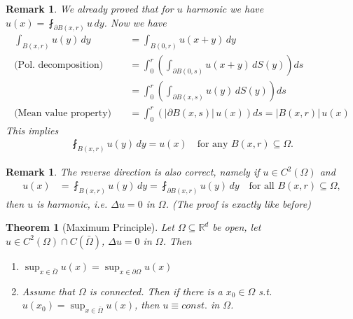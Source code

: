 \documentclass{report}
\theoremstyle{tommy}
\newtheorem{thm}[defn]{Theorem}
\newtheorem{rem}[defn]{Remark}
\begin{document}
  \begin{rem}
    We already proved that for \(u\) harmonic we have \( u(x) = \fint_{\partial B(x,r)} u \, dy \). Now we have 
    \begin{align*}
      \int_{B(x, r)} u(y) \, dy 
      &= \int_{B(0, r)} u(x+y) \, dy \\
      \text{(Pol.\ decomposition)} \quad &= \int_0^r \left(\int_{\partial B(0, s)} u(x+y) \, dS(y)\right) ds \\
      &= \int_0^r \left(\int_{\partial B(x, s)} u(y) \, dS(y) \right) ds \\
      \text{(Mean value property)} \quad &= \int_0^r \left(|\partial B(x, s)| \, u(x) \right) ds
      = |B(x,r)| \, u(x)
    \end{align*}
    This implies
    \begin{align*}
      \fint_{B(x,r)} u(y) \, dy = u(x)
      \quad \text{for any \(B(x,r) \subseteq \Omega\).}
    \end{align*}
  \end{rem}

  \begin{rem}
    The reverse direction is also correct, namely if \(u \in C^2(\Omega)\) and
    \begin{align*}
      u(x) 
      &= \fint_{B(x, r)} u(y) \, dy
      = \fint_{\partial B(x,r)} u(y) \, dy
      \quad \text{for all } B(x,r) \subseteq \Omega,
    \end{align*}
    then \(u\) is harmonic, i.e. \(\Delta u = 0\) in \(\Omega\). (The proof is exactly like before)
  \end{rem}

  \begin{thm}[Maximum Principle]\label{maximum-principle}
    Let \(\Omega \subseteq \mathbb{R}^d\) be open, let \(u \in C^2(\Omega) \cap C(\bar \Omega)\), \(\Delta u = 0\) in \(\Omega\). Then
    \begin{enumerate}[label=\alph*)]
      \item \(\sup_{x \in \bar \Omega} u(x) = \sup_{x \in \partial \Omega} u(x)\)
      \item Assume that \(\Omega\) is connected. Then if there is a \(x_0 \in \Omega\) s.t. \( u(x_0) = \sup_{x \in \bar \Omega} u(x)\), then \( u \equiv const.\) in \(\Omega\).
    \end{enumerate}
  \end{thm}
\end{document}
